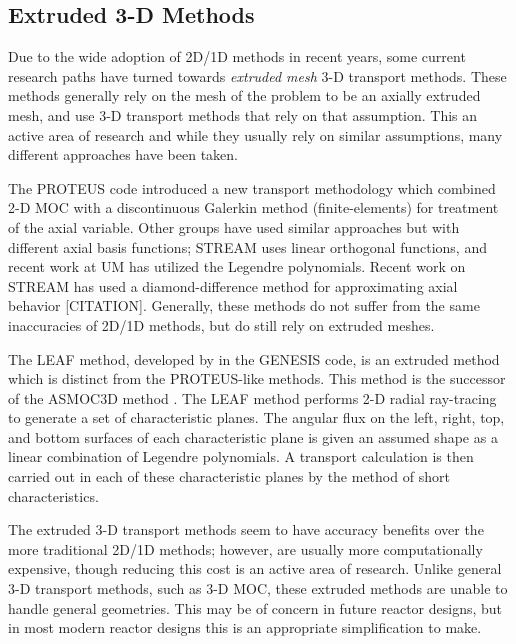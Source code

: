 {{    %
    
    
    

    \subsection{Extruded 3-D Methods}{\label{ssec:3T:Extruded 3-D Methods}
      Due to the wide adoption of 2D/1D methods in recent years, some current research paths have turned towards \emph{extruded mesh} 3-D transport methods.
      These methods generally rely on the mesh of the problem to be an axially extruded mesh, and use 3-D transport methods that rely on that assumption.
      This an active area of research and while they usually rely on similar assumptions, many different approaches have been taken.

      The PROTEUS \cite{Marin-Lafleche2013} code introduced a new transport methodology which combined 2-D \ac{MOC} with a discontinuous Galerkin method (finite-elements) for treatment of the axial variable.
      Other groups have used similar approaches but with different axial basis functions; STREAM \cite{Zheng2017} uses linear orthogonal functions, and recent work at \ac{UM} \cite{HerringExtruded} has utilized the Legendre polynomials.
      Recent work on STREAM has used a diamond-difference method for approximating axial behavior [CITATION].
      Generally, these methods do not suffer from the same inaccuracies of 2D/1D methods, but do still rely on extruded meshes.

      The \acf{LEAF} method, developed by \citet{Yamamoto2017} in the GENESIS code, is an extruded method which is distinct from the PROTEUS-like methods.
      This method is the successor of the ASMOC3D method \cite{Giho2008}.
      The \ac{LEAF} method performs 2-D radial ray-tracing to generate a set of characteristic planes.
      The angular flux on the left, right, top, and bottom surfaces of each characteristic plane is given an assumed shape as a linear combination of Legendre polynomials.
      A transport calculation is then carried out in each of these characteristic planes by the method of short characteristics.

      The extruded 3-D transport methods seem to have accuracy benefits over the more traditional 2D/1D methods;
        however, are usually more computationally expensive, though reducing this cost is an active area of research.
      Unlike general 3-D transport methods, such as 3-D \ac{MOC}, these extruded methods are unable to handle general geometries.
      This may be of concern in future reactor designs, but in most modern reactor designs this is an appropriate simplification to make.
    }
  }

}
